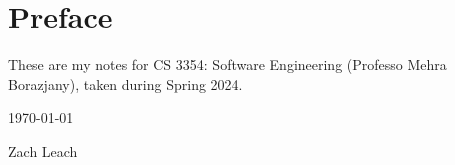 \chapter*{Preface}

These are my notes for CS 3354: Software Engineering (Professo Mehra Borazjany), taken during Spring 2024.

\vspace{12pt}
\hfill \today 

\hfill Zach Leach

